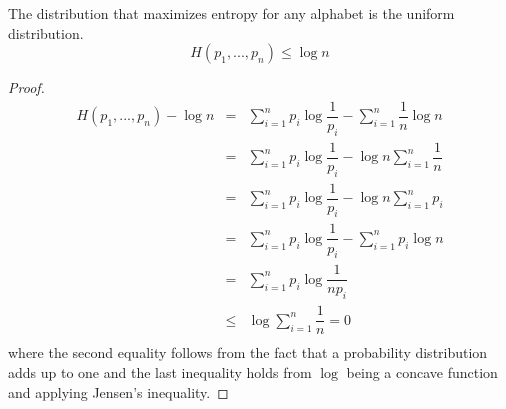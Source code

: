 \begin{lemma}
\label{lem:uniform}
The distribution that maximizes entropy for any alphabet is the uniform distribution.
\begin{equation*}
H(p_1, ..., p_n)\leq \log n
\end{equation*}
\end{lemma}
\begin{proof}
\begin{eqnarray}
H(p_1, ..., p_n)  - \log n & =      & \sum_{i=1}^n p_i \log \dfrac{1}{p_i} - \sum_{i=1}^n \dfrac{1}{n} \log n \nonumber \\
                                       & =      & \sum_{i=1}^n p_i \log \dfrac{1}{p_i} - \log n \sum_{i=1}^n \dfrac{1}{n} \nonumber \\
                                       & =      & \sum_{i=1}^n p_i \log \dfrac{1}{p_i} - \log n \sum_{i=1}^n p_i \nonumber \\
                                       & =      & \sum_{i=1}^n p_i \log \dfrac{1}{p_i} - \sum_{i=1}^n p_i \log n \nonumber \\
                                       & =      & \sum_{i=1}^n p_i \log \dfrac{1}{np_i} \nonumber \\                                      
                                       & \leq &  \log \sum_{i=1}^n \dfrac{1}{n} = 0\nonumber \\
\end{eqnarray}
\noindent where the second equality follows from the fact that a probability distribution adds up to one and the last inequality holds from $\log$ being a concave function and applying Jensen's inequality.
\end{proof}

